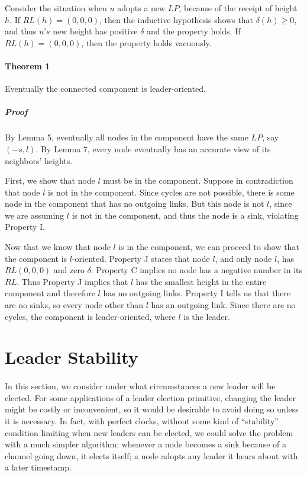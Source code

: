 Consider the situation when $u$ adopts a new $LP$, because of the receipt of height $h$. If $RL(h) = (0, 0, 0)$, then the inductive hypothesis shows that $\delta(h) \geq 0$, and thus $u’s$ new height has positive $\delta$ and the property holds. If $RL(h) = (0, 0, 0)$, then the property holds vacuously.

\paragraph{Theorem 1}Eventually the connected component is leader-oriented.
\subparagraph{Proof}By Lemma 5, eventually all nodes in the component have the same $LP$, say $(-s, l)$. By Lemma 7, every node eventually has an accurate view of its neighbors’ heights. 

First, we show that node $ l $ must be in the component. Suppose in contradiction that node $ l $ is not in the component. Since cycles are not possible, there is some node in the component that has no outgoing links. But this node is not $l$, since we are assuming $ l $ is not in the component, and thus the node is a sink, violating Property I.

Now that we know that node $ l $ is in the component, we can proceed to show that the component is $l$-oriented. Property J states that node $l$, and only node $l$, has $RL (0,0,0)$ and zero $\delta$. Property C implies no node has a negative number in its $RL$. Thus Property J implies that $ l $ has the smallest height in the entire component and therefore $ l $ has no outgoing links. Property I tells us that there are no sinks, so every node other than $ l $ has an outgoing link. Since there are no cycles, the component is leader-oriented, where $ l $ is the leader.
\section{Leader Stability}

\paragraph{}In this section, we consider under what circumstances a new leader will be elected. For some applications of a leader election primitive, changing the leader might be costly or inconvenient, so it would be desirable to avoid doing so unless it is necessary. In fact, with perfect clocks, without some kind of “stability” condition limiting when new leaders can be elected, we could solve the problem with a much simpler algorithm: whenever a node becomes a sink because of a channel going down, it elects itself; a node adopts any leader it hears about with a later timestamp.
